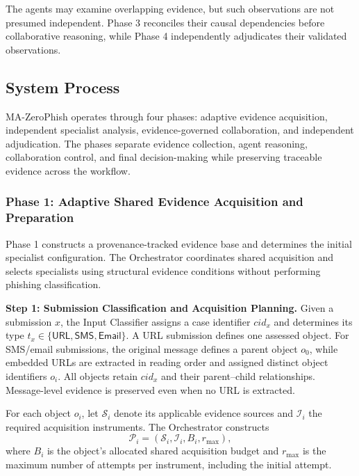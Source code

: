 The agents may examine overlapping
evidence, but such observations are
not presumed independent. Phase 3
reconciles their causal dependencies
before collaborative reasoning, while
Phase 4 independently adjudicates
their validated observations.


\subsection{System Process}
\label{sec:process}

MA-ZeroPhish operates through four phases:
adaptive evidence acquisition, independent
specialist analysis, evidence-governed
collaboration, and independent adjudication.
The phases separate evidence collection,
agent reasoning, collaboration control,
and final decision-making while preserving
traceable evidence across the workflow.



\subsubsection*{\textbf{Phase 1: Adaptive Shared
Evidence Acquisition and Preparation}}
\label{sec:phase1}

Phase 1 constructs a provenance-tracked
evidence base and determines the initial
specialist configuration. The Orchestrator
coordinates shared acquisition and selects
specialists using structural evidence
conditions without performing phishing
classification.

\medskip
\noindent\textbf{Step 1: Submission Classification
and Acquisition Planning.}
Given a submission $x$, the Input Classifier
assigns a case identifier $cid_x$ and determines
its type
$t_x\in\{\mathsf{URL},\mathsf{SMS},\mathsf{Email}\}$.
A URL submission defines one assessed object.
For SMS/email submissions, the original message
defines a parent object $o_0$, while embedded
URLs are extracted in reading order and assigned
distinct object identifiers $o_i$. All objects
retain $cid_x$ and their parent--child
relationships. Message-level evidence is
preserved even when no URL is extracted.

For each object $o_i$, let $\mathcal S_i$
denote its applicable evidence sources and
$\mathcal I_i$ the required acquisition
instruments. The Orchestrator constructs
\begin{equation}
\mathcal P_i=
(\mathcal S_i,\mathcal I_i,B_i,r_{\max}),
\label{eq:acquisition-plan}
\end{equation}
where $B_i$ is the object's allocated shared
acquisition budget and $r_{\max}$ is the
maximum number of attempts per instrument,
including the initial attempt.

